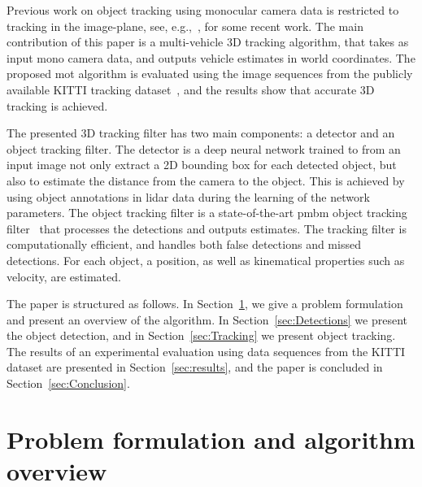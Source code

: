 \documentclass[conference]{IEEEtran}
\begin{document}
Previous work on object tracking using monocular camera data is restricted to tracking in the image-plane, see, e.g.,~\cite{Choi2016,He2016,Xiang2015}, for some recent work. The main contribution of this paper is a multi-vehicle 3D tracking algorithm, that takes as input mono camera data, and outputs vehicle estimates in world coordinates. The proposed \gls{mot} algorithm is evaluated using the image sequences from the publicly available KITTI tracking dataset~\cite{Geiger2012CVPR}, and the results show that accurate 3D tracking is achieved.

The presented 3D tracking filter has two main components: a detector and an object tracking filter.
The detector is a deep neural network trained to from an input image not only extract a 2D bounding box for each detected object, but also to estimate the distance from the camera to the object.
This is achieved by using object annotations in lidar data during the learning of the network parameters.
The object tracking filter is a state-of-the-art \gls{pmbm} object tracking filter~\cite{Williams2015,Garcia-Fernandez2017} that processes the detections and outputs estimates.
The tracking filter is computationally efficient, and handles both false detections and missed detections.
For each object, a position, as well as kinematical properties such as velocity, are estimated.

The paper is structured as follows. In Section~\ref{sec:ProblemFormulationAlgorithmOverview}, we give a problem formulation and present an overview of the algorithm. In Section~\ref{sec:Detections} we present the object detection, and in Section~\ref{sec:Tracking} we present object tracking.
The results of an experimental evaluation using data sequences from the KITTI dataset are presented in Section~\ref{sec:results}, and the paper is concluded in Section~\ref{sec:Conclusion}.

%
 













\section{Problem formulation and algorithm overview}
\label{sec:ProblemFormulationAlgorithmOverview}
\end{document}
